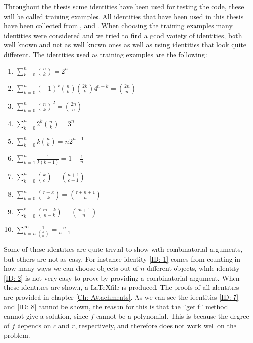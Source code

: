 Throughout the thesis some identities have been used for testing the code, these will be called training examples. All identities that have been used in this thesis have been collected from ,  and . When choosing the training examples many identities were considered and we tried to find a good variety of identities, both well known and not as well known ones as well as using identities that look quite different. The identities used as training examples are the following:
\begin{enumerate}
  \item $\sum_{k=0}^n \binom{n}{k} = 2^n$ \label{ID: 1}
  \item $\sum_{k=0}^n (-1)^k\binom{n}{k}\binom{2k}{k}4^{n-k}=\binom{2n}{n}$ \label{ID: 2}
  \item $\sum_{k=0}^n \binom{n}{k}^2 = \binom{2n}{n}$ \label{ID: 3}
  \item $\sum_{k=0}^n 2^k\binom{n}{k} = 3^n$ \label{ID: 4}
  \item $\sum_{k=0}^n k\binom{n}{k} = n2^{n-1}$ \label{ID: 5}
  \item $\sum_{k=1}^n \frac{1}{k(k-1)} = 1-\frac{1}{n}$ \label{ID: 6}
  \item $\sum_{k=0}^n \binom{k}{c} = \binom{n+1}{c+1}$ \label{ID: 7}
  \item $\sum_{k=0}^n \binom{r+k}{k} = \binom{r+n+1}{n}$ \label{ID: 8}
  \item $\sum_{k=0}^n \binom{m-k}{n-k} = \binom{m+1}{n}$ \label{ID: 9}
  \item $\sum_{k=n}^\infty \frac{1}{\binom{k}{n}}=\frac{n}{n-1}$ \label{ID: 10}
\end{enumerate}
Some of these identities are quite trivial to show with combinatorial arguments, but others are not as easy. For instance identity \ref{ID: 1} comes from counting in how many ways we can choose objects out of $n$ different objects, while identity \ref{ID: 2} is not very easy to prove by providing a combinatorial argument. When these identities are shown, a \LaTeX file is produced. The proofs of all identities are provided in chapter \ref{Ch: Attachments}. As we can see the identities \ref{ID: 7} and \ref{ID: 8} cannot be shown, the reason for this is that the ''get f'' method cannot give a solution, since $f$ cannot be a polynomial. This is because the degree of $f$ depends on $c$ and $r$, respectively, and therefore \WZ does not work well on the problem.

